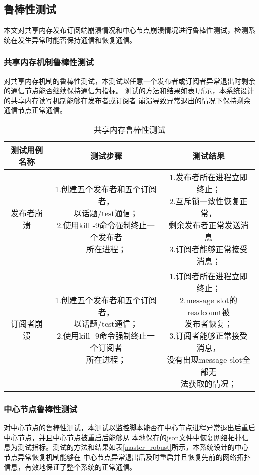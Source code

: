 \subsection{鲁棒性测试}
本文对共享内存发布订阅端崩溃情况和中心节点崩溃情况进行鲁棒性测试，检测系统在发生异常时能否保持通信和恢复通信。
\subsubsection{共享内存机制鲁棒性测试}
对共享内存机制的鲁棒性测试，本测试以任意一个发布者或订阅者异常退出时剩余的通信节点能否继续保持通信为指标。
测试的方法和结果如表\ref{shared_memory_robust}所示，本系统设计的共享内存读写机制能够在发布者或订阅者
崩溃导致异常退出的情况下保持剩余通信节点正常通信。

\begin{table}[H]
  \centering\small
  \caption{共享内存鲁棒性测试}
  \renewcommand\arraystretch{1.2}
  \label{shared_memory_robust}
  \begin{tabular}{ccc}
    \toprule
    测试用例名称 & 测试步骤 & 测试结果 \\
    \midrule
    发布者崩溃 & \makecell[l]{1.创建五个发布者和五个订阅者，\\以话题/test通信；\\2.使用kill -9命令强制终止一个发布者\\所在进程；} & \makecell[l]{1.发布者所在进程立即终止；\\2.互斥锁一致性恢复正常，\\剩余发布者正常发送消息\\3.订阅者能够正常接受消息；}\\
    \hline
    订阅者崩溃 & \makecell[l]{1.创建五个发布者和五个订阅者，\\以话题/test通信；\\2.使用kill -9命令强制终止一个订阅者\\所在进程；} & \makecell[l]{1.订阅者所在进程立即终止；\\2.message slot的readcount被\\发布者恢复；\\3.订阅者能够正常接受消息，\\没有出现message slot全部无\\法获取的情况；} \\
    \bottomrule
  \end{tabular}
\end{table}

\subsubsection{中心节点鲁棒性测试}
对中心节点的鲁棒性测试，本测试以监控脚本能否在中心节点进程异常退出后重启中心节点，并且中心节点被重启后能够从
本地保存的json文件中恢复网络拓扑信息为测试指标。测试的方法和结果如表\ref{master_robust}所示，本系统设计的中心节点异常恢复机制能够在
中心节点异常退出后及时重启并且恢复先前的网络拓扑信息，有效地保证了整个系统的正常通信。

